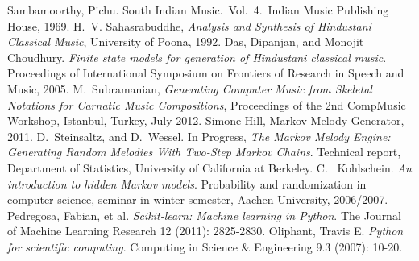 \documentclass[journal]{IEEEtran}
\begin{document}
%
%
%
\begin{thebibliography}{1}
Sambamoorthy, Pichu. South Indian Music.~Vol.~4.~Indian Music Publishing House, 1969.
H.~V. Sahasrabuddhe, \emph{Analysis and Synthesis of Hindustani Classical Music}, University of Poona, 1992.
Das, Dipanjan, and Monojit Choudhury. \emph{Finite state models for generation of Hindustani classical music}. Proceedings of International Symposium on Frontiers of Research in Speech and Music, 2005.
M.~Subramanian, \emph{Generating Computer Music from Skeletal Notations for Carnatic Music Compositions}, Proceedings of the 2nd CompMusic Workshop, Istanbul, Turkey, July 2012.
Simone Hill, Markov Melody Generator, 2011.
D.~Steinsaltz, and D.~Wessel. In Progress, \emph{The Markov Melody Engine: Generating Random Melodies With Two-Step Markov Chains}. Technical report, Department of Statistics, University of California at Berkeley. 
C.~ Kohlschein. \emph{An introduction to hidden Markov models}. Probability and randomization in computer science, seminar in winter semester, Aachen University, 2006/2007. 
Pedregosa, Fabian, et al. \emph{Scikit-learn: Machine learning in Python}. The Journal of Machine Learning Research 12 (2011): 2825-2830. 
Oliphant, Travis E. \emph{Python for scientific computing}. Computing in Science \& Engineering 9.3 (2007): 10-20.
\end{thebibliography}
\end{document}
